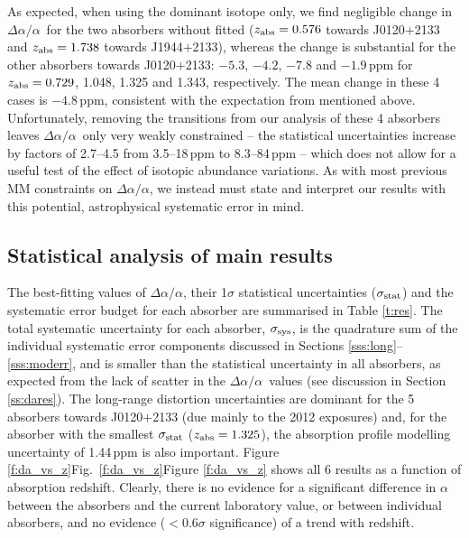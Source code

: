 \documentclass[fleqn,usenatbib,usedcolumn]{mnras}
\newcommand{\Sref}[1]{Section \ref{#1}}
\newcommand{\Tref}[1]{Table \ref{#1}}
\newcommand{\Fref}[1]{\ifhmode \ifnum\spacefactor=1001 Figure \ref{#1}\else Fig.\ \ref{#1}\fi \else Figure \ref{#1}\fi}
\newcommand{\zab}{\ensuremath{z_\textrm{\scriptsize abs}}}
\newcommand{\daa}{\ensuremath{\Delta\alpha/\alpha}}
\begin{document}
As expected, when using the dominant isotope only, we find negligible change in \daa\ for the two absorbers without  fitted ($\zab=0.576$ towards J0120$+$2133 and $\zab=1.738$ towards J1944$+$2133), whereas the change is substantial for the other absorbers towards J0120$+$2133: $-5.3$, $-4.2$, $-7.8$ and $-1.9$\,ppm for $\zab=0.729$, 1.048, 1.325 and 1.343, respectively. The mean change in these 4 cases is $-4.8$\,ppm, consistent with the expectation from \citet{Fenner:2005:468} mentioned above. Unfortunately, removing the  transitions from our analysis of these 4 absorbers leaves \daa\ only very weakly constrained -- the statistical uncertainties increase by factors of 2.7--4.5 from 3.5--18\,ppm to 8.3--84\,ppm -- which does not allow for a useful test of the effect of isotopic abundance variations. As with most previous MM constraints on \daa, we instead must state and interpret our results with this potential, astrophysical systematic error in mind.


\subsection{Statistical analysis of main results}\label{ss:mainres}

The best-fitting values of \daa, their 1$\sigma$ statistical uncertainties ($\sigma_{\rm stat}$) and the systematic error budget for each absorber are summarised in \Tref{t:res}. The total systematic uncertainty for each absorber, $\sigma_{\rm sys}$, is the quadrature sum of the individual systematic error components discussed in Sections \ref{sss:long}--\ref{sss:moderr}, and is smaller than the statistical uncertainty in all absorbers, as expected from the lack of scatter in the \daa\ values (see discussion in \Sref{ss:dares}). The long-range distortion uncertainties are dominant for the 5 absorbers towards J0120$+$2133 (due mainly to the 2012 exposures) and, for the absorber with the smallest $\sigma_{\rm stat}$ ($\zab=1.325$), the absorption profile modelling uncertainty of 1.44\,ppm is also important. \Fref{f:da_vs_z} shows all 6 results as a function of absorption redshift. Clearly, there is no evidence for a significant difference in $\alpha$ between the absorbers and the current laboratory value, or between individual absorbers, and no evidence ($<$0.6$\sigma$ significance) of a trend with redshift.
\end{document}
